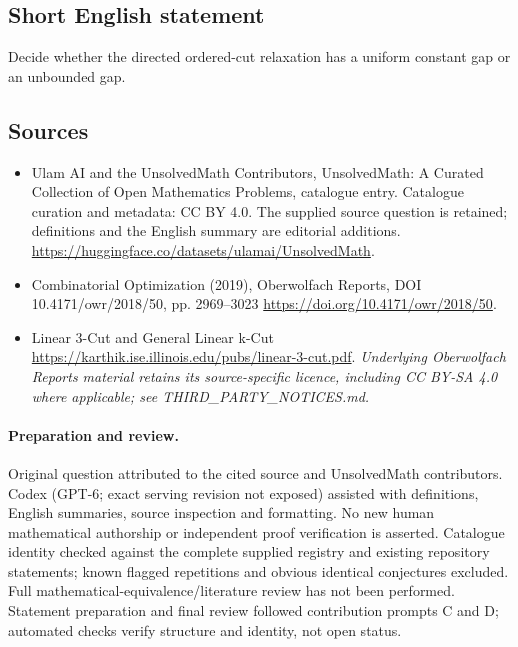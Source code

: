 \documentclass[11pt]{article}
\begin{document}
\subsection{Short English statement}
Decide whether the directed ordered-cut relaxation has a uniform constant gap or an unbounded gap.
\subsection{Sources}
\begin{itemize}
\item[\hypertarget{source:statement:1}{S1}] Ulam AI and the UnsolvedMath Contributors, UnsolvedMath: A Curated Collection of Open Mathematics Problems, catalogue entry. Catalogue curation and metadata: CC BY 4.0. The supplied source question is retained; definitions and the English summary are editorial additions.
\url{https://huggingface.co/datasets/ulamai/UnsolvedMath}.
\item[\hypertarget{source:statement:2}{S2}] Combinatorial Optimization (2019), Oberwolfach Reports, DOI 10.4171/owr/2018/50, pp. 2969--3023
\url{https://doi.org/10.4171/owr/2018/50}.
\item[\hypertarget{source:statement:3}{S3}] Linear 3-Cut and General Linear k-Cut
\url{https://karthik.ise.illinois.edu/pubs/linear-3-cut.pdf}.
\textit{Underlying Oberwolfach Reports material retains its source-specific licence, including CC BY-SA 4.0 where applicable; see THIRD\_PARTY\_NOTICES.md.}
\end{itemize}
\paragraph{Preparation and review.}
Original question attributed to the cited source and UnsolvedMath contributors. Codex (GPT-6; exact serving revision not exposed) assisted with definitions, English summaries, source inspection and formatting. No new human mathematical authorship or independent proof verification is asserted. Catalogue identity checked against the complete supplied registry and existing repository statements; known flagged repetitions and obvious identical conjectures excluded. Full mathematical-equivalence/literature review has not been performed. Statement preparation and final review followed contribution prompts C and D; automated checks verify structure and identity, not open status.
\label{end:statement}
\end{document}
